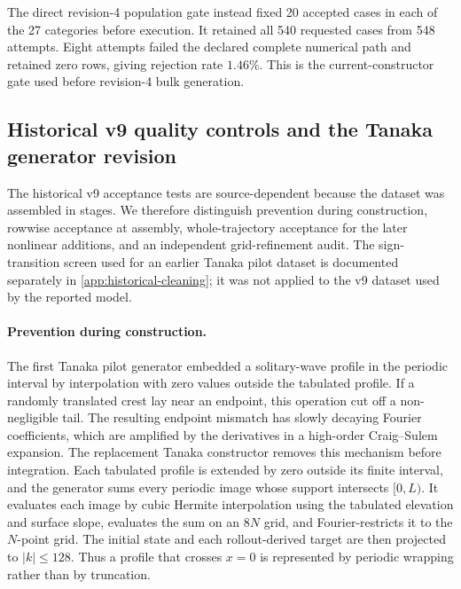 The direct revision-4 population gate instead fixed 20 accepted cases in each
of the 27 categories before execution.  It retained all 540 requested cases
from 548 attempts.  Eight attempts failed the declared complete numerical
path and retained zero rows, giving rejection rate \(1.46\%\).  This is the
current-constructor gate used before revision-4 bulk generation.

\subsection{Historical v9 quality controls and the Tanaka generator revision}

The historical v9 acceptance tests are source-dependent because the dataset
was assembled in stages.  We therefore distinguish prevention during construction, rowwise
acceptance at assembly, whole-trajectory acceptance for the later nonlinear
additions, and an independent grid-refinement audit.  The sign-transition
screen used for an earlier Tanaka pilot dataset is documented separately in
\cref{app:historical-cleaning}; it was not applied to the v9 dataset used by the
reported model.

\paragraph{Prevention during construction.}
The first Tanaka pilot generator embedded a solitary-wave profile in the
periodic interval by interpolation with zero values outside the tabulated
profile.  If a randomly translated crest lay near an endpoint, this operation
cut off a non-negligible tail.  The resulting endpoint mismatch has slowly
decaying Fourier coefficients, which are amplified by the derivatives in a
high-order Craig--Sulem expansion.  The replacement Tanaka constructor removes
this mechanism before integration.  Each tabulated profile is extended by zero
outside its finite interval, and the generator sums every periodic image whose
support intersects $[0,L)$.  It evaluates each image by cubic Hermite
interpolation using the tabulated elevation and surface slope, evaluates the
sum on an $8N$ grid, and Fourier-restricts it to the $N$-point grid.  The
initial state and each rollout-derived target are then projected to
$|k|\leq128$.  Thus a profile that crosses $x=0$ is represented by periodic
wrapping rather than by truncation.

